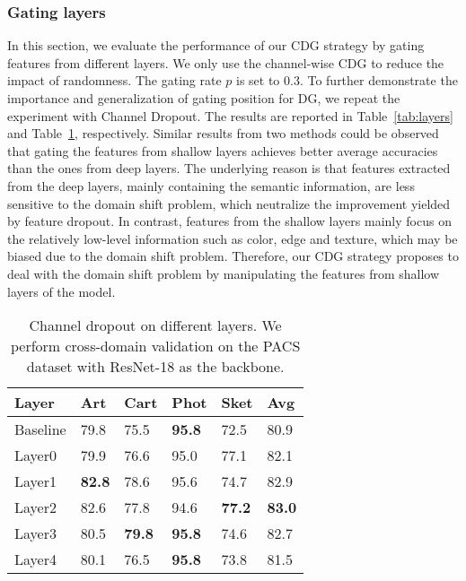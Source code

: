 \subsubsection{Gating layers}
In this section, we evaluate the performance of our CDG strategy by gating features from different layers. We only use the channel-wise CDG to reduce the impact of randomness. The gating rate $p$ is set to 0.3. To further demonstrate the importance and generalization of gating position for DG, we repeat the experiment with Channel Dropout. The results are reported in Table~\ref{tab:layers} and Table~\ref{tab:layers_dropout}, respectively. Similar results from two methods could be observed that gating the features from shallow layers achieves better average accuracies than the ones from deep layers. The underlying reason is that features extracted from the deep layers, mainly containing the semantic information, are less sensitive to the domain shift problem, which neutralize the improvement yielded by feature dropout. In contrast, features from the shallow layers mainly focus on the relatively low-level information such as color, edge and texture, which may be biased due to the domain shift problem. Therefore, our CDG strategy proposes to deal with the domain shift problem by manipulating the features from shallow layers of the model.

\begin{table}[htb]
  \caption{Channel dropout on different layers. We perform cross-domain validation on the PACS dataset with ResNet-18 as the backbone.}
  \label{tab:layers_dropout}
  \begin{center}
    \begin{tabularx}{0.5\textwidth}{p{}<{\centering}|X<{\centering}|X<{\centering}|X<{\centering}|X<{\centering}|X<{\centering}}

      \toprule[0.6pt]
      Layer & Art & Cart & Phot & Sket & Avg           \\
      \midrule[0.4pt]

      Baseline      & 79.8        & 75.5            & \textbf{95.8}  & 72.5   & 80.9          \\
      Layer0        & 79.9        & 76.6            & 95.0           & 77.1   & 82.1          \\
      Layer1        & \textbf{82.8}       & 78.6    & 95.6           & 74.7   & 82.9          \\
      Layer2        & 82.6        & 77.8            & 94.6           & \textbf{77.2}   & \textbf{83.0} \\
      Layer3        & 80.5        & \textbf{79.8}   & \textbf{95.8}  & 74.6   & 82.7          \\
      Layer4        & 80.1        & 76.5            & \textbf{95.8}  & 73.8   & 81.5          \\

      \bottomrule[0.6pt]
    \end{tabularx}
  \end{center}
\end{table}

